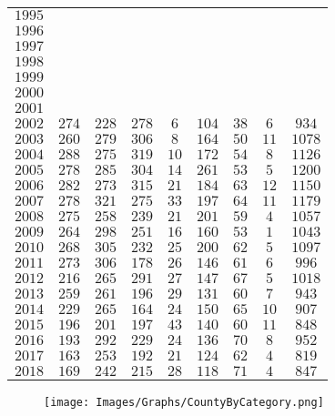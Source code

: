 \begin{longtable}{|l|p{1.1cm}ccccccc|}
    $1995$  &       &       &       &       &       &       &       &       \\
    $1996$  &       &       &       &       &       &       &       &       \\
    $1997$  &       &       &       &       &       &       &       &       \\
    $1998$  &       &       &       &       &       &       &       &       \\
    $1999$  &       &       &       &       &       &       &       &       \\
    $2000$  &       &       &       &       &       &       &       &       \\
    $2001$  &       &       &       &       &       &       &       &       \\
    $2002$  & $274$ & $228$ & $278$ & $6$   & $104$ & $38$  & $6$   & $934$ \\
    $2003$  & $260$ & $279$ & $306$ & $8$   & $164$ & $50$  & $11$  & $1078$ \\
    $2004$  & $288$ & $275$ & $319$ & $10$  & $172$ & $54$  & $8$   & $1126$ \\
    $2005$  & $278$ & $285$ & $304$ & $14$  & $261$ & $53$  & $5$   & $1200$ \\
    $2006$  & $282$ & $273$ & $315$ & $21$  & $184$ & $63$  & $12$  & $1150$ \\
    $2007$  & $278$ & $321$ & $275$ & $33$  & $197$ & $64$  & $11$  & $1179$ \\
    $2008$  & $275$ & $258$ & $239$ & $21$  & $201$ & $59$  & $4$   & $1057$ \\
    $2009$  & $264$ & $298$ & $251$ & $16$  & $160$ & $53$  & $1$   & $1043$ \\
    $2010$  & $268$ & $305$ & $232$ & $25$  & $200$ & $62$  & $5$   & $1097$ \\
    $2011$  & $273$ & $306$ & $178$ & $26$  & $146$ & $61$  & $6$   & $996$ \\
    $2012$  & $216$ & $265$ & $291$ & $27$  & $147$ & $67$  & $5$   & $1018$ \\
    $2013$  & $259$ & $261$ & $196$ & $29$  & $131$ & $60$  & $7$   & $943$ \\
    $2014$  & $229$ & $265$ & $164$ & $24$  & $150$ & $65$  & $10$  & $907$ \\
    $2015$  & $196$ & $201$ & $197$ & $43$  & $140$ & $60$  & $11$  & $848$ \\
    $2016$  & $193$ & $292$ & $229$ & $24$  & $136$ & $70$  & $8$   & $952$ \\
    $2017$  & $163$ & $253$ & $192$ & $21$  & $124$ & $62$  & $4$   & $819$ \\
    $2018$  & $169$ & $242$ & $215$ & $28$  & $118$ & $71$  & $4$   & $847$ \\
\hline
\end{longtable}

\begin{landscape}
\begin{figure}[H]
\centering
\texttt{[image: Images/Graphs/CountyByCategory.png]}
\end{figure}
\end{landscape}
